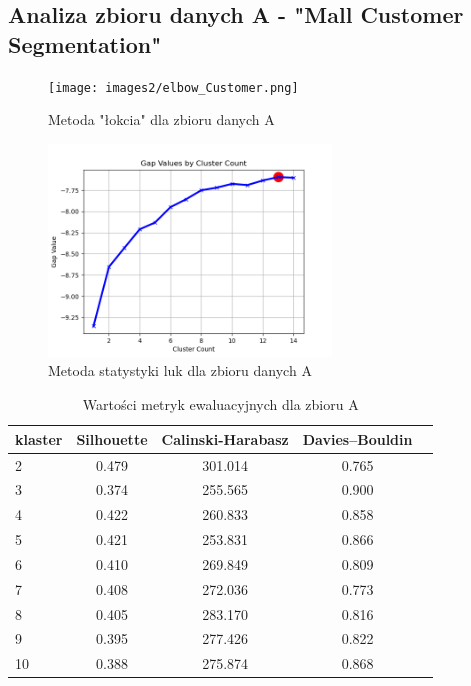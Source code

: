 \documentclass[a4paper,11pt]{article}
\begin{document}
\subsection{Analiza zbioru danych A - "Mall Customer Segmentation"}
\begin{figure}[H]
    	\centering
    	\texttt{[image: images2/elbow\_Customer.png]}
    	\caption{Metoda "łokcia" dla zbioru danych A}
    	\label{silh_a}
\end{figure}
\begin{figure}[H]
    	\centering
    	\includegraphics[width=0.67\textwidth]{images3/GAP1_13.png}
    	\caption{Metoda statystyki luk dla zbioru danych A}
    	\label{silh_b}
\end{figure}
\begin{table}[H]
\centering
\caption{Wartości metryk ewaluacyjnych dla zbioru A}
\label{tab:silh_a}
\begin{tabular}{|l|c|c|c|c|}
\hline
\multicolumn{1}{|c|}{\textbf{klaster}} & \textbf{Silhouette} & \textbf{Calinski-Harabasz} & \textbf{Davies–Bouldin}  \\ \hline
2  & 0.479 & 301.014 & 0.765  \\ \hline
3 & 0.374 & 255.565 & 0.900  \\ \hline
4 & 0.422 & 260.833 & 0.858  \\ \hline
5 & 0.421 & 253.831 & 0.866  \\ \hline
6 & 0.410 & 269.849 & 0.809  \\ \hline
7 & 0.408 & 272.036 & 0.773  \\ \hline
8 & 0.405 & 283.170 & 0.816  \\ \hline
9 & 0.395 & 277.426 & 0.822  \\ \hline
10 & 0.388 & 275.874 & 0.868  \\ \hline
\end{tabular}
\end{table}
\end{document}
